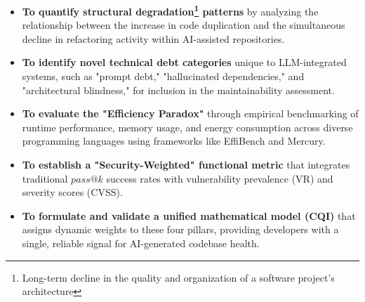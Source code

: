 \begin{itemize}
    \item \textbf{To quantify structural degradation\footnote{Long-term decline in the quality and organization of a software project’s architecture} patterns} by analyzing the relationship between the increase in code duplication and the simultaneous decline in refactoring activity within AI-assisted repositories.
    \item \textbf{To identify novel technical debt categories} unique to LLM-integrated systems, such as "prompt debt," "hallucinated dependencies," and "architectural blindness," for inclusion in the maintainability assessment.
    \item \textbf{To evaluate the "Efficiency Paradox"} through empirical benchmarking of runtime performance, memory usage, and energy consumption across diverse programming languages using frameworks like EffiBench and Mercury.
    \item \textbf{To establish a "Security-Weighted" functional metric} that integrates traditional $pass@k$ success rates with vulnerability prevalence (VR) and severity scores (CVSS). 
    \item \textbf{To formulate and validate a unified mathematical model (CQI)} that assigns dynamic weights to these four pillars, providing developers with a single, reliable signal for AI-generated codebase health. 
\end{itemize}